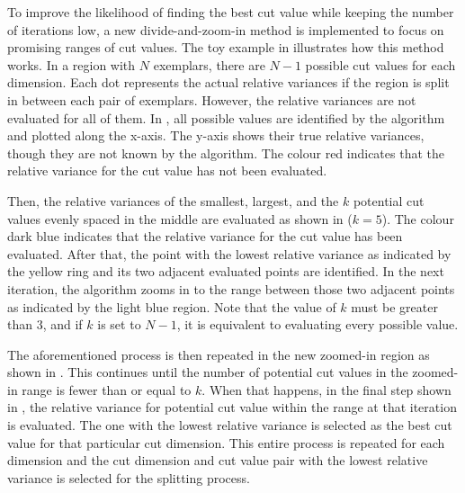 To improve the likelihood of finding the best cut value while keeping the number of iterations low, a new divide-and-zoom-in method is implemented to focus on promising ranges of cut values. The toy example in  illustrates how this method works. In a region with $N$ exemplars, there are $N-1$ possible cut values for each dimension. Each dot represents the actual relative variances if the region is split in between each pair of exemplars. However, the relative variances are not evaluated for all of them. In , all possible values are identified by the algorithm and plotted along the x-axis. The y-axis shows their true relative variances, though they are not known by the algorithm. The colour red indicates that the relative variance for the cut value has not been evaluated. 

Then, the relative variances of the smallest, largest, and the $k$ potential cut values evenly spaced in the middle are evaluated as shown in  ($k=5$). The colour dark blue indicates that the relative variance for the cut value has been evaluated. After that, the point with the lowest relative variance as indicated by the yellow ring and its two adjacent evaluated points are identified. In the next iteration, the algorithm zooms in to the range between those two adjacent points as indicated by the light blue region. Note that the value of $k$ must be greater than 3, and if $k$ is set to $N-1$, it is equivalent to evaluating every possible value. 

The aforementioned process is then repeated in the new zoomed-in region as shown in . This continues until the number of potential cut values in the zoomed-in range is fewer than or equal to $k$. When that happens, in the final step shown in , the relative variance for potential cut value within the range at that iteration is evaluated. The one with the lowest relative variance is selected as the best cut value for that particular cut dimension. 
This entire process is repeated for each dimension and the cut dimension and cut value pair with the lowest relative variance is selected for the splitting process.


